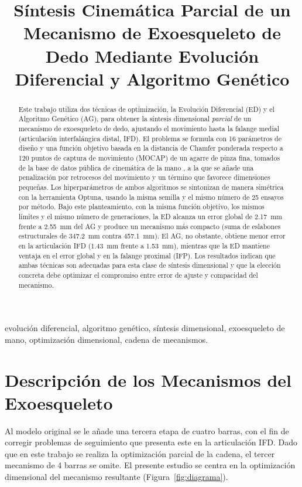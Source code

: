 \documentclass[conference]{IEEEtran}
\begin{document}
\title{Síntesis Cinemática Parcial de un Mecanismo de Exoesqueleto de Dedo Mediante Evolución Diferencial y Algoritmo Genético}

\author{}

\maketitle
\thispagestyle{fancy}

\begin{abstract}
Este trabajo utiliza dos técnicas de optimización, la Evolución Diferencial (ED) y
el Algoritmo Genético (AG),  para obtener la
síntesis dimensional \emph{parcial} de un mecanismo de exoesqueleto de dedo, ajustando el movimiento hasta la falange
medial (articulación interfalángica distal, IFD). El problema se formula con 16
parámetros de diseño y una función objetivo basada en la distancia de Chamfer
ponderada respecto a 120 puntos de captura de movimiento (MOCAP) de un agarre de
pinza fina, tomados de la base de datos pública de cinemática de la mano \cite{ref_pizzolato}, a la que se añade una penalización por
retrocesos del movimiento y un término que favorece dimensiones pequeñas. Los
hiperparámetros de ambos algoritmos se sintonizan de manera simétrica con la
herramienta Optuna, usando la misma semilla y el mismo número de 25 ensayos por
método. Bajo este planteamiento, con la misma función objetivo, los mismos límites
y el mismo número de generaciones, la ED alcanza un error global de 2.17~mm frente
a 2.55~mm del AG y produce un mecanismo más compacto (suma de eslabones
estructurales de 347.2~mm contra 457.1~mm). El AG, no obstante, obtiene menor
error en la articulación IFD (1.43~mm frente a 1.53~mm), mientras que la ED
mantiene ventaja en el error global y en la falange proximal (IFP). Los resultados indican que ambas técnicas son adecuadas para esta clase de síntesis dimensional y que la elección concreta debe
optimizar el compromiso entre error de ajuste y compacidad del mecanismo.
\end{abstract}

\begin{IEEEkeywords}
evolución diferencial, algoritmo genético, síntesis dimensional, exoesqueleto de
mano, optimización dimensional, cadena de mecanismos.
\end{IEEEkeywords}



\section{Descripción de los Mecanismos del Exoesqueleto}
Al modelo original \cite{ref_palma} se le añade una tercera etapa de cuatro barras, con el fin de corregir problemas de
seguimiento que presenta este en la articulación IFD. Dado que en este trabajo se realiza la optimización parcial de la cadena, el tercer mecanismo de 4 barras se omite. El presente estudio se centra en la optimización dimensional del mecanismo resultante
(Figura~\ref{fig:diagrama}).
\end{document}
